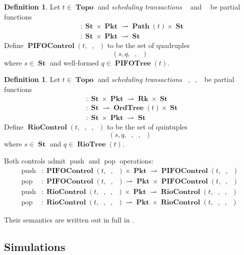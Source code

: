 \documentclass{amsart}
\DeclareMathOperator{\halfto}{\rightharpoonup}
\DeclareMathOperator{\push}{\mathrm{push}}
\DeclareMathOperator{\pop}{\mathrm{pop}}
\DeclareMathOperator{\Pkt}{\mathbf{Pkt}}
\DeclareMathOperator{\Rk}{\mathbf{Rk}}
\DeclareMathOperator{\Topo}{\mathbf{Topo}}
\DeclareMathOperator{\Path}{\mathbf{Path}}
\DeclareMathOperator{\PIFOTree}{\mathbf{PIFOTree}}
\DeclareMathOperator{\St}{\mathbf{St}}
\DeclareMathOperator{\RioTree}{\mathbf{RioTree}}
\DeclareMathOperator{\OrdTree}{\mathbf{OrdTree}}
\DeclareMathOperator{\PIFOControl}{\mathbf{PIFOControl}}
\DeclareMathOperator{\RioControl}{\mathbf{RioControl}}
\DeclareMathOperator{\zprepush}{z_{\mathrm{pre-push}}}
\DeclareMathOperator{\zprepop}{z_{\mathrm{pre-pop}}}
\DeclareMathOperator{\zpostpop}{z_{\mathrm{post-pop}}}
\theoremstyle{definition}
\newtheorem{dfn}[thm]{Definition}
\begin{document}
\begin{dfn}
    Let $t \in \Topo$ and \emph{scheduling transactions} $\zprepush$ and $\zpostpop$ be partial functions
    \begin{align*}
        \zprepush &: \St \times \Pkt \halfto \Path(t) \times \St\\
        \zpostpop &: \St \times \Pkt \halfto \St
    \end{align*}
    Define $\PIFOControl(t, \zprepush, \zpostpop)$ to be the set of quadruples 
    $$(s, q, \zprepush, \zpostpop)$$
    where $s \in \St$ and well-formed $q \in \PIFOTree(t)$.
\end{dfn}

\begin{dfn}
    Let $t \in \Topo$ and \emph{scheduling transactions} $\zprepush, \zprepop, \zpostpop$ be partial functions
    \begin{align*}
        \zprepush &: \St \times \Pkt \halfto \Rk \times \St\\
        \zprepop  &: \St \halfto \OrdTree(t) \times \St\\
        \zpostpop &: \St \times \Pkt \halfto \St
    \end{align*}
    Define $\RioControl(t, \zprepush, \zprepop, \zpostpop)$ to be the set of quintuples 
    $$(s, q, \zprepush, \zprepop, \zpostpop)$$ 
    where $s \in \St$ and $q \in \RioTree(t)$.
\end{dfn}

Both controls admit $\push$ and $\pop$ operations:
\begin{align*}
    \push &: \PIFOControl(t, \zprepush, \zpostpop) \times \Pkt \halfto \PIFOControl(t, \zprepush, \zpostpop)\\
    \pop  &: \PIFOControl(t, \zprepush, \zpostpop) \halfto \Pkt \times \PIFOControl(t, \zprepush, \zpostpop)\\
    \push &: \RioControl(t, \zprepush, \zprepop, \zpostpop) \times \Pkt \halfto \RioControl(t, \zprepush, \zprepop, \zpostpop)\\
    \pop  &: \RioControl(t, \zprepush, \zprepop, \zpostpop) \halfto \Pkt \times \RioControl(t, \zprepush, \zprepop, \zpostpop)
\end{align*}

Their semantics are written out in full in .

\subsection{Simulations}
\end{document}
